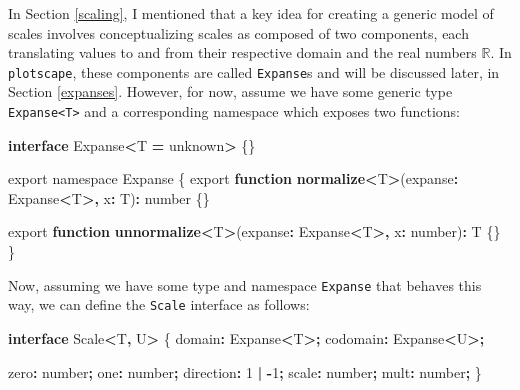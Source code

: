 \documentclass[
  openany]{book}
\newenvironment{Shaded}{\begin{snugshade}}{\end{snugshade}}
\newcommand{\DataTypeTok}[1]{\textcolor[rgb]{0.13,0.29,0.53}{#1}}
\newcommand{\DecValTok}[1]{\textcolor[rgb]{0.00,0.00,0.81}{#1}}
\newcommand{\FunctionTok}[1]{\textcolor[rgb]{0.13,0.29,0.53}{\textbf{#1}}}
\newcommand{\ImportTok}[1]{#1}
\newcommand{\KeywordTok}[1]{\textcolor[rgb]{0.13,0.29,0.53}{\textbf{#1}}}
\newcommand{\NormalTok}[1]{#1}
\newcommand{\OperatorTok}[1]{\textcolor[rgb]{0.81,0.36,0.00}{\textbf{#1}}}
\theoremstyle{definition}
\theoremstyle{definition}
\theoremstyle{definition}
\theoremstyle{definition}
\theoremstyle{remark}
\begin{document}
In Section \ref{scaling}, I mentioned that a key idea for creating a generic model of scales involves conceptualizing scales as composed of two components, each translating values to and from their respective domain and the real numbers \(\mathbb{R}\). In \texttt{plotscape}, these components are called \texttt{Expanse}s and will be discussed later, in Section \ref{expanses}. However, for now, assume we have some generic type \texttt{Expanse\textless{}T\textgreater{}} and a corresponding namespace which exposes two functions:

\begin{Shaded}
\begin{Highlighting}[]
\KeywordTok{interface}\NormalTok{ Expanse}\OperatorTok{\textless{}}\NormalTok{T }\OperatorTok{=} \DataTypeTok{unknown}\OperatorTok{\textgreater{}}\NormalTok{ \{\}}

\ImportTok{export} \ImportTok{namespace} \DataTypeTok{Expanse}\NormalTok{ \{}
  \ImportTok{export} \KeywordTok{function} \FunctionTok{normalize}\OperatorTok{\textless{}}\NormalTok{T}\OperatorTok{\textgreater{}}\NormalTok{(expanse}\OperatorTok{:}\NormalTok{ Expanse}\OperatorTok{\textless{}}\NormalTok{T}\OperatorTok{\textgreater{},} 
\NormalTok{                               x}\OperatorTok{:}\NormalTok{ T)}\OperatorTok{:} \DataTypeTok{number}\NormalTok{ \{\}}
  
  \ImportTok{export} \KeywordTok{function} \FunctionTok{unnormalize}\OperatorTok{\textless{}}\NormalTok{T}\OperatorTok{\textgreater{}}\NormalTok{(expanse}\OperatorTok{:}\NormalTok{ Expanse}\OperatorTok{\textless{}}\NormalTok{T}\OperatorTok{\textgreater{},} 
\NormalTok{                                 x}\OperatorTok{:} \DataTypeTok{number}\NormalTok{)}\OperatorTok{:}\NormalTok{ T \{\}}
\NormalTok{\}}
\end{Highlighting}
\end{Shaded}

Now, assuming we have some type and namespace \texttt{Expanse} that behaves this way, we can define the \texttt{Scale} interface as follows:

\begin{Shaded}
\begin{Highlighting}[]
\KeywordTok{interface}\NormalTok{ Scale}\OperatorTok{\textless{}}\NormalTok{T}\OperatorTok{,}\NormalTok{ U}\OperatorTok{\textgreater{}}\NormalTok{ \{}
\NormalTok{  domain}\OperatorTok{:}\NormalTok{ Expanse}\OperatorTok{\textless{}}\NormalTok{T}\OperatorTok{\textgreater{};}
\NormalTok{  codomain}\OperatorTok{:}\NormalTok{ Expanse}\OperatorTok{\textless{}}\NormalTok{U}\OperatorTok{\textgreater{};}

\NormalTok{  zero}\OperatorTok{:} \DataTypeTok{number}\OperatorTok{;}
\NormalTok{  one}\OperatorTok{:} \DataTypeTok{number}\OperatorTok{;}
\NormalTok{  direction}\OperatorTok{:} \DecValTok{1} \OperatorTok{|} \OperatorTok{{-}}\DecValTok{1}\OperatorTok{;}
\NormalTok{  scale}\OperatorTok{:} \DataTypeTok{number}\OperatorTok{;}
\NormalTok{  mult}\OperatorTok{:} \DataTypeTok{number}\OperatorTok{;}
\NormalTok{\}}
\end{Highlighting}
\end{Shaded}
\end{document}
